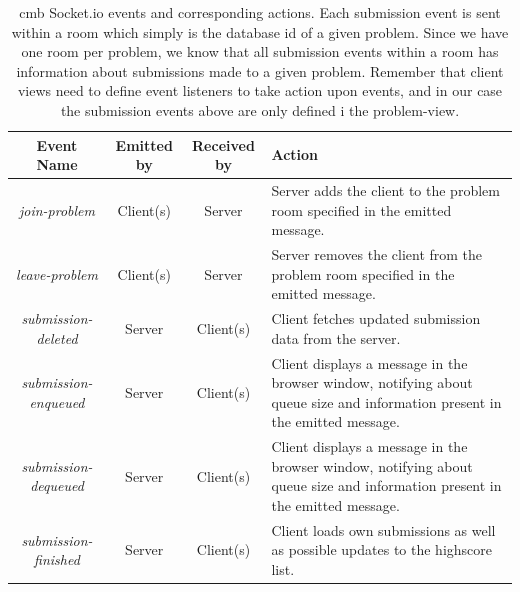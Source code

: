 \begin{table}[t!]
    \centering
    \begin{tabular}{ | c | c | c | p{3.5cm} | }
    \hline
    \textbf{Event Name} & \textbf{Emitted by} & \textbf{Received by} & \textbf{Action}\\
    \hline
    \textit{join-problem} & Client(s) & Server & Server adds the client to the problem room specified in the emitted message. \\ \hline
    \textit{leave-problem} & Client(s) & Server & Server removes the client from the problem room specified in the emitted message. \\ \hline
    \textit{submission-deleted} & Server & Client(s) & Client fetches updated submission data from the server. \\ \hline
    \textit{submission-enqueued} & Server & Client(s) & Client displays a message in the browser window, notifying about queue size and information present in the emitted message. \\ \hline
    \textit{submission-dequeued} & Server & Client(s) & Client displays a message in the browser window, notifying about queue size and information present in the emitted message. \\ \hline
    \textit{submission-finished} & Server & Client(s) & Client loads own submissions as well as possible updates to the highscore list. \\ \hline
    \end{tabular}
    \caption[\gls{cmb} Socket.io events and corresponding actions]{\gls{cmb} Socket.io events and corresponding actions. Each submission event is sent within a room which simply is the database id of a given problem. Since we have one room per problem, we know that all submission events within a room has information about submissions made to a given problem. Remember that client views need to define event listeners to take action upon events, and in our case the submission events above are only defined i the problem-view.}
    \label{tab:cmb-socketio-events}
\end{table}

